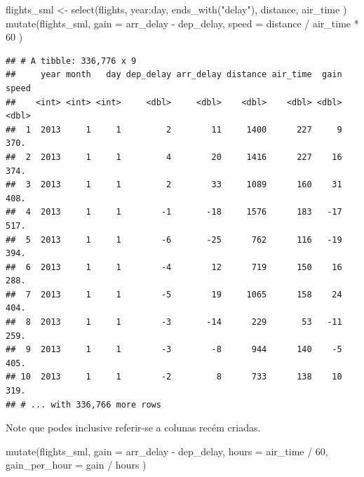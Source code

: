 \documentclass[
]{article}
\newenvironment{Shaded}{\begin{snugshade}}{\end{snugshade}}
\newcommand{\AttributeTok}[1]{\textcolor[rgb]{0.77,0.63,0.00}{#1}}
\newcommand{\DecValTok}[1]{\textcolor[rgb]{0.00,0.00,0.81}{#1}}
\newcommand{\FunctionTok}[1]{\textcolor[rgb]{0.00,0.00,0.00}{#1}}
\newcommand{\NormalTok}[1]{#1}
\newcommand{\OtherTok}[1]{\textcolor[rgb]{0.56,0.35,0.01}{#1}}
\newcommand{\SpecialCharTok}[1]{\textcolor[rgb]{0.00,0.00,0.00}{#1}}
\newcommand{\StringTok}[1]{\textcolor[rgb]{0.31,0.60,0.02}{#1}}
\begin{document}
\begin{Shaded}
\begin{Highlighting}[]
\NormalTok{flights\_sml }\OtherTok{\textless{}{-}} \FunctionTok{select}\NormalTok{(flights, }
\NormalTok{  year}\SpecialCharTok{:}\NormalTok{day, }
  \FunctionTok{ends\_with}\NormalTok{(}\StringTok{"delay"}\NormalTok{), }
\NormalTok{  distance, }
\NormalTok{  air\_time}
\NormalTok{)}
\FunctionTok{mutate}\NormalTok{(flights\_sml,}
  \AttributeTok{gain =}\NormalTok{ arr\_delay }\SpecialCharTok{{-}}\NormalTok{ dep\_delay,}
  \AttributeTok{speed =}\NormalTok{ distance }\SpecialCharTok{/}\NormalTok{ air\_time }\SpecialCharTok{*} \DecValTok{60}
\NormalTok{)}
\end{Highlighting}
\end{Shaded}

\begin{verbatim}
## # A tibble: 336,776 x 9
##     year month   day dep_delay arr_delay distance air_time  gain speed
##    <int> <int> <int>     <dbl>     <dbl>    <dbl>    <dbl> <dbl> <dbl>
##  1  2013     1     1         2        11     1400      227     9  370.
##  2  2013     1     1         4        20     1416      227    16  374.
##  3  2013     1     1         2        33     1089      160    31  408.
##  4  2013     1     1        -1       -18     1576      183   -17  517.
##  5  2013     1     1        -6       -25      762      116   -19  394.
##  6  2013     1     1        -4        12      719      150    16  288.
##  7  2013     1     1        -5        19     1065      158    24  404.
##  8  2013     1     1        -3       -14      229       53   -11  259.
##  9  2013     1     1        -3        -8      944      140    -5  405.
## 10  2013     1     1        -2         8      733      138    10  319.
## # ... with 336,766 more rows
\end{verbatim}

Note que podes inclusive referir-se a colunas recém criadas.

\begin{Shaded}
\begin{Highlighting}[]
\FunctionTok{mutate}\NormalTok{(flights\_sml,}
  \AttributeTok{gain =}\NormalTok{ arr\_delay }\SpecialCharTok{{-}}\NormalTok{ dep\_delay,}
  \AttributeTok{hours =}\NormalTok{ air\_time }\SpecialCharTok{/} \DecValTok{60}\NormalTok{,}
  \AttributeTok{gain\_per\_hour =}\NormalTok{ gain }\SpecialCharTok{/}\NormalTok{ hours}
\NormalTok{)}
\end{Highlighting}
\end{Shaded}
\end{document}

